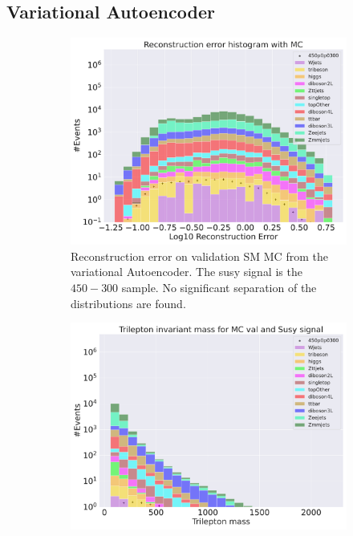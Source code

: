 \subsection*{Variational Autoencoder}

\begin{figure}[h!]
    \centering
    \begin{subfigure}{.8\textwidth}
        \includegraphics[width=\textwidth]{Figures/VAE_testing/b_data_recon_big_rm3_feats_sig_450p0p0300.pdf}
        \caption{Reconstruction error on validation SM MC from the variational Autoencoder. The susy signal is the $450-300$ sample. 
        No significant separation of the distributions are found. }
        \label{fig:vae_susy_450_300_recon}
    \end{subfigure}
    \hfill
    \begin{subfigure}{.8\textwidth}
        \includegraphics[width=\textwidth]{Figures/VAE_testing/b_data_recon_big_rm3_feats_sig_450p0p0300_Trilepton mass.pdf}

\end{subfigure}
\end{figure}
